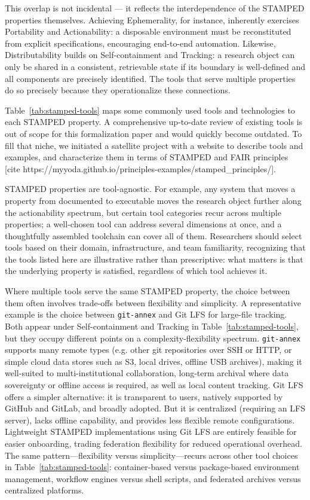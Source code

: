 \documentclass{article}
\begin{document}
This overlap is not incidental — it reflects the interdependence of the STAMPED properties themselves.
Achieving Ephemerality, for instance, inherently exercises Portability and Actionability: a disposable environment must be reconstituted from explicit specifications, encouraging end-to-end automation.
Likewise, Distributability builds on Self-containment and Tracking: a research object can only be shared in a consistent, retrievable state if its boundary is well-defined and all components are precisely identified.
The tools that serve multiple properties do so precisely because they operationalize these connections.

Table~\ref{tab:stamped-tools} maps some commonly used tools and technologies to each STAMPED property.
A comprehensive up-to-date review of existing tools is out of scope for this formalization paper and would quickly become outdated.
To fill that niche, we initiated a satellite project with a website to describe tools and examples, and characterize them in terms of STAMPED and FAIR principles [cite https://myyoda.github.io/principles-examples/stamped\_principles/].

STAMPED properties are tool-agnostic. For example, any system that moves a property from documented to executable moves the research object further along the actionability spectrum, but certain tool categories recur across multiple properties; a well-chosen tool can address several dimensions at once, and a thoughtfully assembled toolchain can cover all of them.
Researchers should select tools based on their domain, infrastructure, and team familiarity, recognizing that the tools listed here are illustrative rather than prescriptive: what matters is that the underlying property is satisfied, regardless of which tool achieves it.

Where multiple tools serve the same STAMPED property, the choice between them often involves trade-offs between flexibility and simplicity.
A representative example is the choice between \texttt{git-annex} and Git LFS for large-file tracking.
Both appear under Self-containment and Tracking in Table~\ref{tab:stamped-tools}, but they occupy different points on a complexity-flexibility spectrum.
\texttt{git-annex} supports many remote types (e.g. other git repositories over SSH or HTTP, or simple cloud data stores such as S3, local drives, offline USB archives), making it well-suited to multi-institutional collaboration, long-term archival where data sovereignty or offline access is required, as well as local content tracking.
Git LFS offers a simpler alternative: it is transparent to users, natively supported by GitHub and GitLab, and broadly adopted.
But it is centralized (requiring an LFS server), lacks offline capability, and provides less flexible remote configurations.
Lightweight STAMPED implementations using Git LFS are entirely feasible for easier onboarding, trading federation flexibility for reduced operational overhead.
The same pattern---flexibility versus simplicity---recurs across other tool choices in Table~\ref{tab:stamped-tools}: container-based versus package-based environment management, workflow engines versus shell scripts, and federated archives versus centralized platforms.
\end{document}
